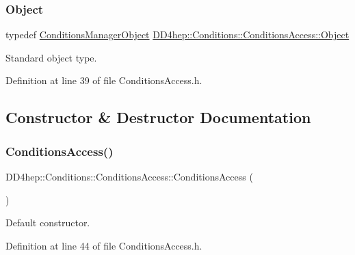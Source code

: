 \subsubsection{\texorpdfstring{Object}{Object}}
{\footnotesize\ttfamily typedef \hyperlink{class_d_d4hep_1_1_conditions_1_1_conditions_manager_object}{Conditions\+Manager\+Object} \hyperlink{class_d_d4hep_1_1_conditions_1_1_conditions_access_a5d82a416d51349abaf6075b2028faecc}{D\+D4hep\+::\+Conditions\+::\+Conditions\+Access\+::\+Object}}



Standard object type. 



Definition at line 39 of file Conditions\+Access.\+h.



\subsection{Constructor \& Destructor Documentation}
\hypertarget{class_d_d4hep_1_1_conditions_1_1_conditions_access_a837aa2f7c771e192a535024a1fc2f10a}{}\label{class_d_d4hep_1_1_conditions_1_1_conditions_access_a837aa2f7c771e192a535024a1fc2f10a} 
\subsubsection{\texorpdfstring{Conditions\+Access()}{ConditionsAccess()}\hspace{0.1cm}{\footnotesize\ttfamily [1/4]}}
{\footnotesize\ttfamily D\+D4hep\+::\+Conditions\+::\+Conditions\+Access\+::\+Conditions\+Access (\begin{DoxyParamCaption}{ }\end{DoxyParamCaption})\hspace{0.3cm}{\ttfamily [inline]}}



Default constructor. 



Definition at line 44 of file Conditions\+Access.\+h.

\hypertarget{class_d_d4hep_1_1_conditions_1_1_conditions_access_a1f9e4b69121bbb7416bce5086bab7e9c}{}\label{class_d_d4hep_1_1_conditions_1_1_conditions_access_a1f9e4b69121bbb7416bce5086bab7e9c} 
